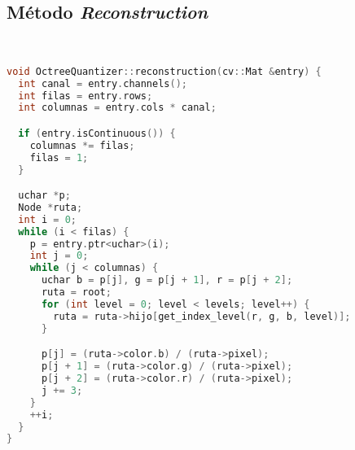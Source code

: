 \subsection{Método \textit{Reconstruction}}
\\
\begin{lstlisting}[language=C++,
                   directivestyle={\color{black}}
                   emph={int,char,double,float,unsigned},
                   emphstyle={\color{blue}}
                  ]
void OctreeQuantizer::reconstruction(cv::Mat &entry) {
  int canal = entry.channels();
  int filas = entry.rows;
  int columnas = entry.cols * canal;

  if (entry.isContinuous()) {
    columnas *= filas;
    filas = 1;
  }

  uchar *p;
  Node *ruta;
  int i = 0;
  while (i < filas) {
    p = entry.ptr<uchar>(i);
    int j = 0;
    while (j < columnas) {
      uchar b = p[j], g = p[j + 1], r = p[j + 2];
      ruta = root;
      for (int level = 0; level < levels; level++) {
        ruta = ruta->hijo[get_index_level(r, g, b, level)];
      }

      p[j] = (ruta->color.b) / (ruta->pixel);
      p[j + 1] = (ruta->color.g) / (ruta->pixel);
      p[j + 2] = (ruta->color.r) / (ruta->pixel);
      j += 3;
    }
    ++i;
  }
}
\end{lstlisting}